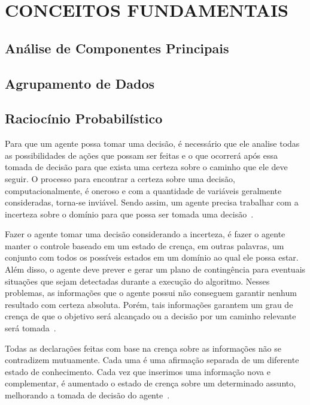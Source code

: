 \chapter{CONCEITOS FUNDAMENTAIS}
\label{cap:ai}

\section{Análise de Componentes Principais}
\label{sec:pca}

\section{Agrupamento de Dados}
\label{sec:clustering}

\section{Raciocínio Probabilístico}
\label{sec:raciocinio-probabilistico}

Para que um agente possa tomar uma decisão, é necessário que ele analise todas as possibilidades de ações que possam ser feitas e o que ocorrerá após essa tomada de decisão para que exista uma certeza sobre o caminho que ele deve seguir. O processo para encontrar a certeza sobre uma decisão, computacionalmente, é oneroso e com a quantidade de variáveis geralmente consideradas, torna-se inviável. Sendo assim, um agente precisa trabalhar com a incerteza sobre o domínio para que possa ser tomada uma decisão~\cite{Russell:2002}.

Fazer o agente tomar uma decisão considerando a incerteza, é fazer o agente manter o controle baseado em um estado de crença, em outras palavras, um conjunto com todos os possíveis estados em um domínio ao qual ele possa estar. Além disso, o agente deve prever e gerar um plano de contingência para eventuais situações que sejam detectadas durante a execução do algoritmo. Nesses problemas, as informações que o agente possui não conseguem garantir nenhum resultado com certeza absoluta. Porém, tais informações garantem um grau de crença de que o objetivo será alcançado ou a decisão por um caminho relevante será tomada~\cite{Russell:2002}.

Todas as declarações feitas com base na crença sobre as informações não se contradizem mutuamente. Cada uma é uma afirmação separada de um diferente estado de conhecimento. Cada vez que inserimos uma informação nova e complementar, é aumentado o estado de crença sobre um determinado assunto, melhorando a tomada de decisão do agente~\cite{Russell:2002}.

